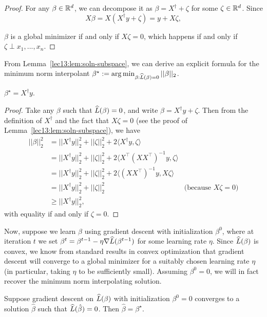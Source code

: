 \begin{proof}
For any $\beta \in \mathbb R^d$, we can decompose it as $\beta = X^\dagger + \zeta$ for some $\zeta \in \mathbb R^d$. Since
\begin{equation}
X\beta = X (X^\dagger y + \zeta) = y + X\zeta,
\end{equation}

$\beta$ is a global minimizer if and only if $X\zeta = 0$, which happens if and only if $\zeta \perp x_1,...,x_n$.

\end{proof}

From Lemma~\ref{lec13:lem:soln-subspace}, we can derive an explicit formula for the minimum norm interpolant $\beta^\star := \arg \min_{\beta : \widehat{L}(\beta) = 0} ||\beta||_2$.
\begin{corollary}
$\beta^\star = X^\dagger y$.
\end{corollary}

\begin{proof}
Take any $\beta$ such that $\widehat{L}(\beta) = 0$, and write $\beta = X^\dagger y + \zeta$. Then from the definition of $X^\dagger$ and the fact that $X \zeta = 0$ (see the proof of Lemma~\ref{lec13:lem:soln-subspace}), we have 
\begin{align}
    ||\beta||_2^2 &= ||X^\dagger y||_2^2 + ||\zeta||_2^2 + 2 \langle X^\dagger y, \zeta \rangle \\
    &= ||X^\dagger y||_2^2 + ||\zeta||_2^2 + 2 \langle X^\top(X X^\top)^{-1} y, \zeta \rangle \\
    &= ||X^\dagger y||_2^2 + ||\zeta||_2^2 + 2 \langle (X X^\top)^{-1} y, X \zeta \rangle \\
    &= ||X^\dagger y||_2^2 + ||\zeta||_2^2 &\text{(because $X\zeta = 0$)} \\
    &\geq ||X^\dagger y||_2^2,
\end{align}
with equality if and only if $\zeta = 0$.

\end{proof}

Now, suppose we learn $\beta$ using gradient descent with initialization $\beta^0$, where at iteration $t$ we set $\beta^t = \beta^{t-1} - \eta \nabla \widehat{L}(\beta^{t-1})$ for some learning rate $\eta$. Since $\widehat{L} (\beta)$ is convex, we know from standard results in convex optimization that gradient descent will converge to a global minimizer for a suitably chosen learning rate $\eta$ (in particular, taking $\eta$ to be sufficiently small). Assuming $\beta^0 = 0$, we will in fact recover the minimum norm interpolating solution.
\begin{theorem}\label{lec13:thm:linear-main}
Suppose gradient descent on $\widehat{L}(\beta)$ with initialization $\beta^0 = 0$ converges to a solution $\hat \beta$ such that $\widehat{L}(\hat \beta) = 0$. Then $\hat \beta = \beta^\star$.
\end{theorem}

